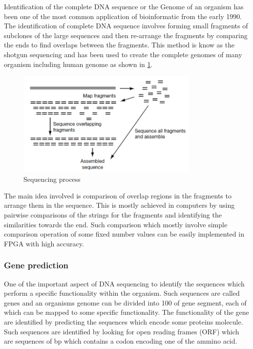 \documentclass[12pt,twoside]{article}
\begin{document}
Identification of the complete DNA sequence or the Genome of an organism has been one of the most common
application of bioinformatic from the early 1990. The identification of complete DNA sequence involves
forming small fragments of subclones of the large sequences and then re-arrange the fragments by comparing
the ends to find overlaps between the fragments\cite[Chapter 2, Genome sequencing]{mount_bioinformatics:_2004}.
This method is know as the shotgun sequencing and has been used to create the complete genomes of many organism
including human genome as shown in \cref{fig:sequence}.

\begin{figure}%
    \centering
    \includegraphics[width=0.8\textwidth]{fig/sequence}
    \caption{Sequencing process \cite[Figure 2.4]{mount_bioinformatics:_2004}}
    \label{fig:sequence}
\end{figure}

The main idea involved is comparison of overlap regions in the fragments to arrange them in the sequence. This
is mostly achieved in computers by using pairwise comparisons of the strings for the fragments and identifying
the similarities towards the end. Such comparison which mostly involve simple comparison operation of some
fixed number values can be easily implemented in FPGA with high accuracy.

\subsubsection{Gene prediction}

One of the important aspect of DNA sequencing to identify the sequences which perform a specific functionality
within the organism. Such sequences are called genes and an organisms genome can be divided into 100 of gene
segment, each of which can be mapped to some specific functionality. The functionality of the gene are identified
by predicting the sequences which encode some proteins molecule. Such sequences are identified by looking for
open reading frames (ORF) which are sequences of bp which contains a codon encoding one of the ammino acid.
\end{document}
